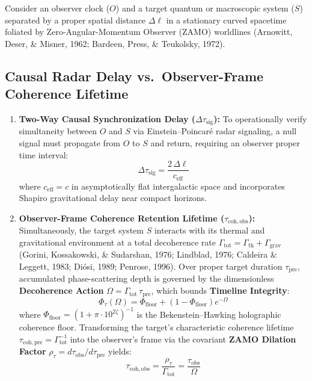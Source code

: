 \documentclass[11pt,a4paper]{article}
\begin{document}
Consider an observer clock ($O$) and a target quantum or macroscopic system ($S$) separated by a proper spatial distance $\Delta \ell$ in a stationary curved spacetime foliated by Zero-Angular-Momentum Observer (ZAMO) worldlines (Arnowitt, Deser, \& Misner, 1962; Bardeen, Press, \& Teukolsky, 1972).

\subsection{Causal Radar Delay vs.\ Observer-Frame Coherence Lifetime}
\begin{enumerate}
    \item \textbf{Two-Way Causal Synchronization Delay ($\Delta \tau_{\mathrm{sig}}$):} To operationally verify simultaneity between $O$ and $S$ via Einstein--Poincar\'e radar signaling, a null signal must propagate from $O$ to $S$ and return, requiring an observer proper time interval:
    \begin{equation}
        \Delta \tau_{\mathrm{sig}} = \frac{2\,\Delta \ell}{c_{\mathrm{eff}}}
    \end{equation}
    where $c_{\mathrm{eff}} = c$ in asymptotically flat intergalactic space and incorporates Shapiro gravitational delay near compact horizons.
    \item \textbf{Observer-Frame Coherence Retention Lifetime ($\tau_{\mathrm{coh, obs}}$):} Simultaneously, the target system $S$ interacts with its thermal and gravitational environment at a total decoherence rate $\Gamma_{\mathrm{tot}} = \Gamma_{\mathrm{th}} + \Gamma_{\mathrm{grav}}$ (Gorini, Kossakowski, \& Sudarshan, 1976; Lindblad, 1976; Caldeira \& Leggett, 1983; Di\'osi, 1989; Penrose, 1996). Over proper target duration $\tau_{\mathrm{pre}}$, accumulated phase-scattering depth is governed by the dimensionless \textbf{Decoherence Action} $\Omega = \Gamma_{\mathrm{tot}}\,\tau_{\mathrm{pre}}$, which bounds \textbf{Timeline Integrity}:
    \begin{equation}
        \Phi_\tau(\Omega) = \Phi_{\mathrm{floor}} + (1 - \Phi_{\mathrm{floor}})e^{-\Omega}
    \end{equation}
    where $\Phi_{\mathrm{floor}} = (1 + \pi \cdot 10^{2\zeta})^{-1}$ is the Bekenstein--Hawking holographic coherence floor. Transforming the target's characteristic coherence lifetime $\tau_{\mathrm{coh, pre}} = \Gamma_{\mathrm{tot}}^{-1}$ into the observer's frame via the covariant \textbf{ZAMO Dilation Factor} $\rho_\tau = d\tau_{\mathrm{obs}} / d\tau_{\mathrm{pre}}$ yields:
    \begin{equation}
        \tau_{\mathrm{coh, obs}} = \frac{\rho_\tau}{\Gamma_{\mathrm{tot}}} = \frac{\tau_{\mathrm{obs}}}{\Omega}
    \end{equation}
\end{enumerate}
\end{document}
